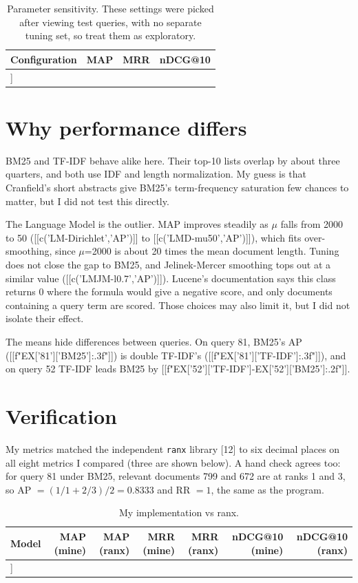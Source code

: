 \begin{table}[H]\small\centering\caption{Parameter sensitivity. These settings were picked after viewing test queries, with no separate tuning set, so treat them as exploratory.}
\begin{tabular}{@{}lrrr@{}}\toprule
Configuration & MAP & MRR & nDCG@10 \\\midrule
[[t_sens()]]
\bottomrule\end{tabular}\end{table}

\section{Why performance differs}
BM25 and TF-IDF behave alike here. Their top-10 lists overlap by about three quarters, and both use IDF and length normalization. My guess is that Cranfield's short abstracts give BM25's term-frequency saturation few chances to matter, but I did not test this directly.

The Language Model is the outlier. MAP improves steadily as $\mu$ falls from 2000 to 50 ([[c('LM-Dirichlet','AP')]] to [[c('LMD-mu50','AP')]]), which fits over-smoothing, since $\mu$=2000 is about 20 times the mean document length. Tuning does not close the gap to BM25, and Jelinek-Mercer smoothing tops out at a similar value ([[c('LMJM-l0.7','AP')]]). Lucene's documentation says this class returns 0 where the formula would give a negative score, and only documents containing a query term are scored. Those choices may also limit it, but I did not isolate their effect.

The means hide differences between queries. On query 81, BM25's AP ([[f"{EX['81']['BM25']:.3f}"]]) is double TF-IDF's ([[f"{EX['81']['TF-IDF']:.3f}"]]), and on query 52 TF-IDF leads BM25 by [[f"{EX['52']['TF-IDF']-EX['52']['BM25']:.2f}"]].

\section{Verification}
My metrics matched the independent \texttt{ranx} library [12] to six decimal places on all eight metrics I compared (three are shown below). A hand check agrees too: for query 81 under BM25, relevant documents 799 and 672 are at ranks 1 and 3, so AP $=(1/1+2/3)/2=0.8333$ and RR $=1$, the same as the program.
\begin{table}[H]\small\centering\caption{My implementation vs ranx.}
\begin{tabular}{@{}lrrrrrr@{}}\toprule
Model & MAP (mine) & MAP (ranx) & MRR (mine) & MRR (ranx) & nDCG@10 (mine) & nDCG@10 (ranx) \\\midrule
[[t_ranx()]]
\bottomrule\end{tabular}\end{table}

